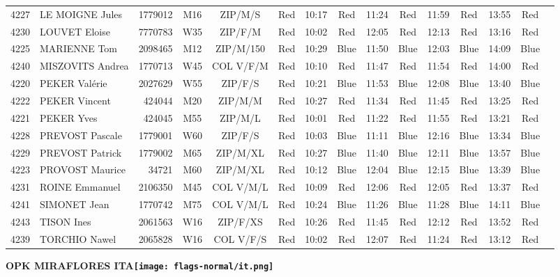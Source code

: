 \documentclass{report}
\begin{document}
\begin{longtable}{|c|l|r|c|c|*{5}{cc|}}
    4227 & LE MOIGNE Jules & 1779012 & M16 & ZIP/M/S & Red & 10:17 & Red & 11:24 & Red & 11:59 & Red & 13:55 & Red &  \\
    4230 & LOUVET Eloise & 7770783 & W35 & ZIP/F/M & Red & 10:02 & Red & 12:05 & Red & 12:13 & Red & 13:16 & Red &  \\
    4225 & MARIENNE Tom & 2098465 & M12 & ZIP/M/150 & Red & 10:29 & Blue & 11:50 & Blue & 12:03 & Blue & 14:09 & Blue &  \\
    4240 & MISZOVITS Andrea & 1770713 & W45 & COL V/F/M & Red & 10:10 & Red & 11:47 & Red & 11:54 & Red & 14:00 & Red &  \\
    4220 & PEKER Valérie & 2027629 & W55 & ZIP/F/S & Red & 10:21 & Blue & 11:53 & Blue & 12:08 & Blue & 13:40 & Blue &  \\
    4222 & PEKER Vincent & 424044 & M20 & ZIP/M/M & Red & 10:27 & Red & 11:34 & Red & 11:45 & Red & 13:25 & Red &  \\
    4221 & PEKER Yves & 424045 & M55 & ZIP/M/L & Red & 10:01 & Red & 11:22 & Red & 11:55 & Red & 13:21 & Red &  \\
    4228 & PREVOST Pascale & 1779001 & W60 & ZIP/F/S & Red & 10:03 & Blue & 11:11 & Blue & 12:16 & Blue & 13:34 & Blue &  \\
    4229 & PREVOST Patrick & 1779002 & M65 & ZIP/M/XL & Red & 10:27 & Blue & 11:40 & Blue & 12:11 & Blue & 13:57 & Blue &  \\
    4223 & PROVOST Maurice & 34721 & M60 & ZIP/M/XL & Red & 10:12 & Blue & 12:04 & Blue & 12:15 & Blue & 13:39 & Blue &  \\
    4231 & ROINE Emmanuel & 2106350 & M45 & COL V/M/L & Red & 10:09 & Red & 12:06 & Red & 12:05 & Red & 13:37 & Red &  \\
    4241 & SIMONET Jean & 1770742 & M75 & COL V/M/L & Red & 10:24 & Blue & 11:26 & Blue & 11:28 & Blue & 14:11 & Blue &  \\
    4243 & TISON Ines & 2061563 & W16 & ZIP/F/XS & Red & 10:26 & Red & 11:45 & Red & 12:12 & Red & 13:52 & Red &  \\
    4239 & TORCHIO Nawel & 2065828 & W16 & COL V/F/S & Red & 10:02 & Red & 12:07 & Red & 11:24 & Red & 13:12 & Red &  \\
  \end{longtable}
\newpage
  \Huge \centering \bfseries OPK MIRAFLORES  ITA\normalfont \footnotesize \sffamily \hfill \texttt{[image: flags-normal/it.png]} \newline 
\end{document}
